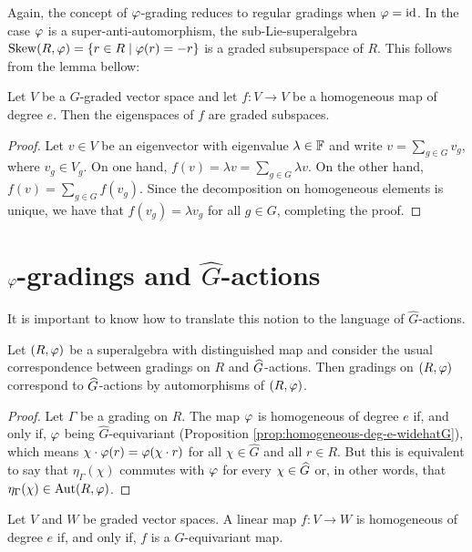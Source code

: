 \documentclass{amsbook}
\begin{document}
Again, the concept of $\varphi$-grading reduces to regular gradings when $\varphi = \operatorname{id}$. In the case $\varphi$ is a super-anti-automorphism, the sub-Lie-superalgebra $\operatorname{Skew} (R, \varphi) = \{ r\in R \mid \varphi(r) = -r \}$ is a graded subsuperspace of $R$. This follows from the lemma bellow:

\begin{lemma}
    Let $V$ be a $G$-graded vector space and let $f: V \to V$ be a homogeneous map of degree $e$. Then the eigenspaces of $f$ are graded subspaces.
\end{lemma}

\begin{proof}
    Let $v\in V$ be an eigenvector with eigenvalue $\lambda \in \mathbb{F}$ and write $v = \sum_{g\in G} v_g$, where $v_g \in V_g$. On one hand, $f(v) = \lambda v = \sum_{g\in G} \lambda v$. On the other hand, $f(v) = \sum_{g\in G} f(v_g)$. Since the decomposition on homogeneous elements is unique, we have that $f(v_g) = \lambda v_g$ for all $g\in G$, completing the proof.
\end{proof}

\section{$\varphi$-gradings and $\widehat G$-actions}

It is important to know how to translate this notion to the language of $\widehat G$-actions.

\begin{prop}
    Let $(R, \varphi)$ be a superalgebra with distinguished map and consider the usual correspondence between gradings on $R$ and $\widehat G$-actions. Then gradings on $(R, \varphi)$ correspond to $\widehat G$-actions by automorphisms of $(R, \varphi)$.
\end{prop}

\begin{proof}
    Let $\Gamma$ be a grading on $R$. The map $\varphi$ is homogeneous of degree $e$ if, and only if, $\varphi$ being $\widehat G$-equivariant (Proposition \ref{prop:homogeneous-deg-e-widehatG}), which means $\chi\cdot \varphi (r) = \varphi (\chi\cdot r)$ for all $\chi \in \widehat G$ and all $r \in R$. But this is equivalent to say that $\eta_\Gamma(\chi)$ commutes with $\varphi$ for every $\chi \in \widehat G$ or, in other words, that $\eta_\Gamma(\chi) \in \operatorname{Aut} (R, \varphi)$. 
\end{proof}

\begin{prop}\label{prop:homogeneous-deg-e-widehatG}
    Let $V$ and $W$ be graded vector spaces. A linear map $f: V \to W$ is homogeneous of degree $e$ if, and only if, $f$ is a $\widehat G$-equivariant map.
\end{prop}
\end{document}
